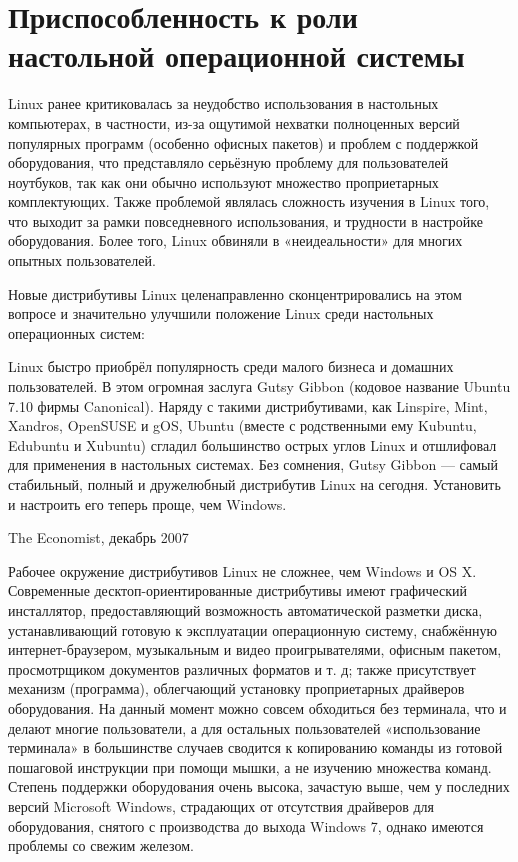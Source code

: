 \section*{Приспособленность к роли настольной операционной системы}

Linux ранее критиковалась за неудобство использования в настольных компьютерах, в частности, из-за ощутимой нехватки полноценных версий популярных программ (особенно офисных пакетов) и проблем с поддержкой оборудования, что представляло серьёзную проблему для пользователей ноутбуков, так как они обычно используют множество проприетарных комплектующих. Также проблемой являлась сложность изучения в Linux того, что выходит за рамки повседневного использования, и трудности в настройке оборудования. Более того, Linux обвиняли в «неидеальности» для многих опытных пользователей.

Новые дистрибутивы Linux целенаправленно сконцентрировались на этом вопросе и значительно улучшили положение Linux среди настольных операционных систем:

\epigraph
{
Linux быстро приобрёл популярность среди малого бизнеса и домашних пользователей. В этом огромная заслуга Gutsy Gibbon (кодовое название Ubuntu 7.10 фирмы Canonical). Наряду с такими дистрибутивами, как Linspire, Mint, Xandros, OpenSUSE и gOS, Ubuntu (вместе с родственными ему Kubuntu, Edubuntu и Xubuntu) сгладил большинство острых углов Linux и отшлифовал для применения в настольных системах. Без сомнения, Gutsy Gibbon — самый стабильный, полный и дружелюбный дистрибутив Linux на сегодня. Установить и настроить его теперь проще, чем Windows.
}
{The Economist, декабрь 2007}
Рабочее окружение дистрибутивов Linux не сложнее, чем Windows и OS X. Современные десктоп-ориентированные дистрибутивы имеют графический инсталлятор, предоставляющий возможность автоматической разметки диска, устанавливающий готовую к эксплуатации операционную систему, снабжённую интернет-браузером, музыкальным и видео проигрывателями, офисным пакетом, просмотрщиком документов различных форматов и т. д; также присутствует механизм (программа), облегчающий установку проприетарных драйверов оборудования. На данный момент можно совсем обходиться без терминала, что и делают многие пользователи, а для остальных пользователей «использование терминала» в большинстве случаев сводится к копированию команды из готовой пошаговой инструкции при помощи мышки, а не изучению множества команд. Степень поддержки оборудования очень высока, зачастую выше, чем у последних версий Microsoft Windows, страдающих от отсутствия драйверов для оборудования, снятого с производства до выхода Windows 7, однако имеются проблемы со свежим железом.

